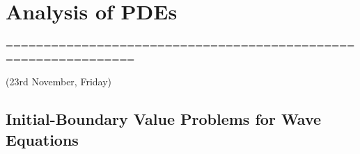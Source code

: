 \documentclass[12pt,a4paper]{report}
\DeclarePairedDelimiter\bignorm{\lVert}{\rVert}
\begin{document}
\newcommand{\thm}{\textbf{Theorem) }}
\newcommand{\thmnum}[1]{\textbf{Theorem #1) }}
\newcommand{\defi}{\textbf{Definition) }}
\newcommand{\definum}[1]{\textbf{Definition #1) }}
\newcommand{\lem}{\textbf{Lemma) }}
\newcommand{\lemnum}[1]{\textbf{Lemma #1) }}
\newcommand{\prop}{\textbf{Proposition) }}
\newcommand{\propnum}[1]{\textbf{Proposition #1) }}
\newcommand{\corr}{\textbf{Corollary) }}
\newcommand{\corrnum}[1]{\textbf{Corollary #1) }}
\newcommand{\pf}{\textbf{proof) }}

\newcommand{\lap}{\triangle} %
\newcommand{\s}{\vspace{10pt}}
\newcommand{\bull}{$\bullet$}
\newcommand{\sta}{$\star$}
\newcommand{\reals}{\mathbb{R}}

\newcommand{\eop}{\hfill  \textsl{(End of proof)} $\square$} %
\newcommand{\eos}{\hfill  \textsl{(End of statement)} $\square$} %


\newcommand{\intN}{\mathbb{Z}_N}
\newcommand{\nat}{\mathbb{N}}
\newcommand{\norms}[2]{\bignorm[\big]{#1}_{#2}}
\newcommand{\abs}[1]{\big| #1 \big|}
\newcommand{\avg}{\mathbb{E}}
\newcommand{\prob}{\mathbb{P}}
\newcommand{\borel}{\mathscr{B}}
\newcommand{\EE}{\mathscr{E}}
\newcommand{\pa}{\partial}
\newcommand{\loc}{L^1_{\text{loc}}}

\renewcommand{\vec}{\underline}
\renewcommand{\bar}{\overline}

\def\doubleunderline#1{\underline{\underline{#1}}}

\newcommand{\newday}{===============================================================}
\newcommand{\digression}{**********************************************************************************************}


\setlength\parindent{0pt}

\chapter*{Analysis of PDEs}
\s

\newday

(23rd November, Friday)
\s

\section*{Initial-Boundary Value Problems for Wave Equations}
\end{document}
